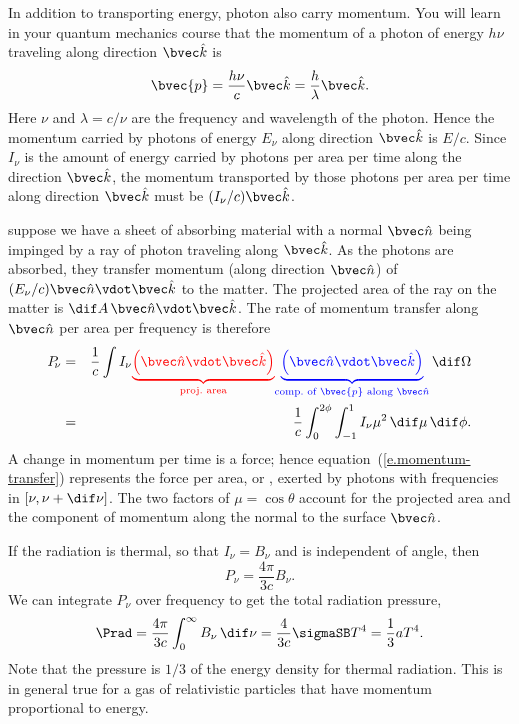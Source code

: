 \begin{sidebar}
\label{sb.radiation-pressure}
In addition to transporting energy, photon also carry momentum. You will learn in your quantum mechanics course that the momentum of a photon of energy $h\nu$ traveling along direction $\unitk$ is
\[ \bvec{p} = \frac{h\nu}{c}\unitk = \frac{h}{\lambda}\unitk. \]
Here $\nu$ and $\lambda = c/\nu$ are the frequency and wavelength of the photon. Hence the momentum carried by photons of energy $E_{\nu}$ along direction $\unitk$ is $E/c$. Since $I_{\nu}$ is the amount of energy carried by photons per area per time along the direction $\unitk$, the momentum transported by those photons per area per time along direction $\unitk$ must be $(I_{\nu}/c)\unitk$.

 suppose we have a sheet of absorbing material with a normal $\unitn$ being impinged by a ray of photon traveling along $\unitk$. As the photons are absorbed, they transfer momentum (along direction $\unitn$) of $(E_{\nu}/c)\unitn\vdot\unitk$ to the matter. The projected area of the ray on the matter is $\dif A\,\unitn\vdot\unitk$. The rate of momentum transfer along $\unitn$ per area per frequency is therefore
\begin{eqnarray}
P_{\!\nu} &=& \frac{1}{c}\int I_{\nu}
	{\color{red}\underbrace{\left(\unitn\vdot\unitk\right)}_{\textrm{proj.~area}}}
	{\color{blue}\underbrace{\left(\unitn\vdot\unitk\right)}_{\textrm{comp.\ of $\bvec{p}$ along $\unitn$}}}
	\,\dif\Omega \nonumber\\
	&=& \frac{1}{c}\int_{0}^{2\phi}\int_{-1}^{1}I_{\nu} \mu^{2}\,\dif \mu\,\dif\phi.
\label{e.momentum-transfer}
\end{eqnarray}
A change in momentum per time is a force; hence equation~(\ref{e.momentum-transfer}) represents the force per area, or , exerted by photons with frequencies in $[\nu,\nu+\dif\nu]$. The two factors of $\mu=\cos\theta$ account for the projected area and the component of momentum along the normal to the surface $\unitn$.

If the radiation is thermal, so that $I_{\nu} = B_{\nu}$ and is independent of angle, then
\[
	P_{\!\nu} = \frac{4\pi}{3c}B_{\nu}.
\]
We can integrate $P_{\!\nu}$ over frequency to get the total radiation pressure,
\begin{equation}\label{e.radiation-pressure}
	\Prad = \frac{4\pi}{3c}\int_{0}^{\infty}B_{\nu}\,\dif\nu = \frac{4}{3c}\sigmaSB T^{4} = \frac{1}{3}aT^{4}.
\end{equation}
Note that the pressure is $1/3$ of the energy density for thermal radiation. This is in general true for a gas of relativistic particles that have momentum proportional to energy.
\end{sidebar}

